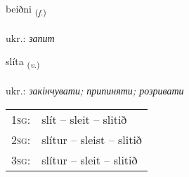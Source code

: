 \documentclass[frontgrid, backgrid]{flacards}\usepackage[]{graphicx}\usepackage[]{xcolor}
\begin{document}
\renewcommand{\flhead}{\vskip5pt \fboxsep=0pt {\small\bfseries\footnotesize Nafnorð | іменник}}
\renewcommand{\fcfoot}{\vskip5pt \fboxsep=0pt \hspace{2pt}{\small\bfseries\footnotesize 2K}}

\renewcommand{\blhead}{\vskip5pt {\small\bfseries\footnotesize Nafnorð | іменник }}
\renewcommand{\bcfoot}{\vskip5pt \hspace{2pt}{\small\bfseries\footnotesize 2K}}


{beiðni \small{\textsubscript{(\textit{f.})}} \\[1ex] %
\textphonetic{[peiðnɪ]} \\
ukr.: \emph{запит} \\  [2ex]
\renewcommand*{\arraystretch}{0.8}
}

\renewcommand{\flhead}{\vskip5pt \fboxsep=0pt {\small\bfseries\footnotesize Sagnorð | дієслово}}
\renewcommand{\fcfoot}{\vskip5pt \fboxsep=0pt \hspace{2pt}{\small\bfseries\footnotesize 2K}}

\renewcommand{\blhead}{\vskip5pt {\small\bfseries\footnotesize Sagnorð | дієслово }}
\renewcommand{\bcfoot}{\vskip5pt \hspace{2pt}{\small\bfseries\footnotesize 2K}}


{slíta \small{\textsubscript{(\textit{v.})}} \\[1ex] %
\textphonetic{[stliːta]} \\
ukr.: \emph{закінчувати; припиняти; розривати} \\  [2ex]
\renewcommand*{\arraystretch}{0.8}
\begin{tabular}{p{1cm}l}
\textsc{1sg}: & slít -- sleit -- slitið \\ 
\textsc{2sg}: & slítur -- sleist -- slitið \\ 
\textsc{3sg}: & slítur -- sleit -- slitið \\ 
\end{tabular}
}
\end{document}
